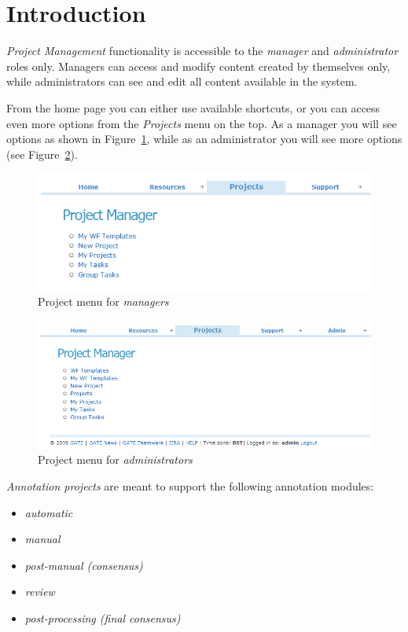 \section{Introduction}
\emph{Project Management} functionality is accessible to the \emph{manager} and \emph{administrator} roles
only. Managers can access and modify content created by themselves only, while administrators can see and edit all content available in the system.

From the home page you
can either use available shortcuts, or you can access even more options from the
\emph{Projects} menu on the top. As a manager you will see options as shown in
Figure~\ref{fig:manager-home-page}, while as an administrator you will see more options (see Figure~\ref{fig:admin-home-page}).

\begin{figure}[htb]
\centering
\includegraphics[scale=0.5]{manager-home-page}
\caption{Project menu for \emph{managers}}
\label{fig:manager-home-page}
\end{figure}

\begin{figure}[htb]
\centering
\includegraphics[scale=0.5]{admin-home-page}
\caption{Project menu for \emph{administrators}}
\label{fig:admin-home-page}
\end{figure}


\emph{Annotation projects} are meant to support the following annotation
modules: 

 \begin{itemize}
   \item \emph{automatic}
   \item \emph{manual}
   \item \emph{post-manual (consensus)}
   \item \emph{review}
   \item \emph{post-processing (final consensus)}
 \end{itemize}


